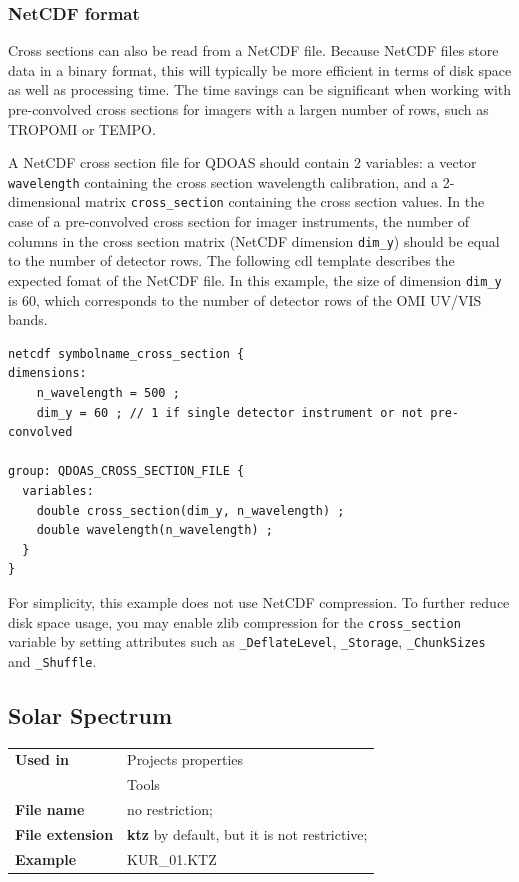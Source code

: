 \subsubsection{NetCDF format}
Cross sections can also be read from a NetCDF file.  Because NetCDF files store data in a binary format, this will typically be more efficient in terms of disk space as well as processing time.  The time savings can be significant when working with pre-convolved cross sections for imagers with a largen number of rows, such as TROPOMI or TEMPO.

A NetCDF cross section file for QDOAS should contain 2 variables: a vector \texttt{wavelength} containing the cross section wavelength calibration, and a 2-dimensional matrix \texttt{cross\_section} containing the cross section values.  In the case of a pre-convolved cross section for imager instruments, the number of columns in the cross section matrix (NetCDF dimension \texttt{dim\_y}) should be equal to the number of detector rows.  The following cdl template describes the expected fomat of the NetCDF file.  In this example, the size of dimension \texttt{dim\_y} is 60, which corresponds to the number of detector rows of the OMI UV/VIS bands.

\begin{Verbatim}[fontfamily=courier,fontsize=\relsize{-2}]
netcdf symbolname_cross_section {
dimensions:
	n_wavelength = 500 ;
	dim_y = 60 ; // 1 if single detector instrument or not pre-convolved

group: QDOAS_CROSS_SECTION_FILE {
  variables:
  	double cross_section(dim_y, n_wavelength) ;
  	double wavelength(n_wavelength) ;
  }
}
\end{Verbatim}
For simplicity, this example does not use NetCDF compression.  To further reduce disk space usage, you may enable zlib compression for the \texttt{cross\_section} variable by setting attributes such as
\texttt{\_DeflateLevel}, \texttt{\_Storage}, \texttt{\_ChunkSizes} and \texttt{\_Shuffle}.

\subsection{Solar Spectrum}\hfill
\begin{minipage}[t]{\textwidth}
\vspace{-0.6\baselineskip}
\begin{tabular}[h]{l p{8cm}}
\textbf{Used in} & Projects properties \\
                 & Tools \\ [6pt]
\textbf{File name} & no restriction; \\ [6pt]
\textbf{File extension} & \textbf{ktz} by default, but it is not restrictive; \\ [6pt]
\textbf{Example} & KUR\_01.KTZ
\end{tabular}
\end{minipage}

